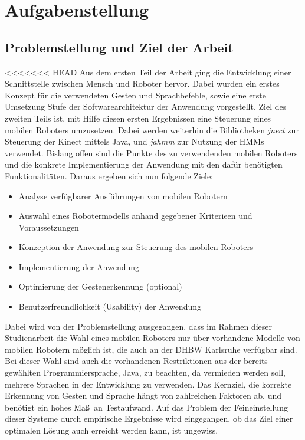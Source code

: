 \chapter{Aufgabenstellung}
\label{chap:Aufgabenstellung}

\section{Problemstellung und Ziel der Arbeit}
<<<<<<< HEAD
\label{sec:Problemstellung und Ziel der Arbeit}
Aus dem ersten Teil der Arbeit ging die Entwicklung einer Schnittstelle zwischen Mensch und Roboter hervor. Dabei wurden ein erstes Konzept f\"ur die verwendeten Gesten und Sprachbefehle, sowie eine erste Umsetzung Stufe der Softwarearchitektur der Anwendung vorgestellt. Ziel des zweiten Teils ist, mit Hilfe diesen ersten Ergebnissen eine Steuerung eines mobilen Roboters umzusetzen. Dabei werden weiterhin die Bibliotheken \textit{jnect} zur Steuerung der Kinect mittels Java, und \textit{jahmm} zur Nutzung der \glspl{HMM} verwendet. Bislang offen sind die Punkte des zu verwendenden mobilen Roboters und die konkrete Implementierung der Anwendung mit den daf\"ur ben\"otigten Funktionalit\"aten.
\newline
Daraus ergeben sich nun folgende Ziele:
\begin{itemize}
\item Analyse verf\"ugbarer Ausf\"uhrungen von mobilen Robotern
\item Auswahl eines Robotermodells anhand gegebener Kriterieen und Voraussetzungen
\item Konzeption der Anwendung zur Steuerung des mobilen Roboters
\item Implementierung der Anwendung
\item Optimierung der Gestenerkennung (optional)
\item Benutzerfreundlichkeit (Usability) der Anwendung
\end{itemize}
Dabei wird von der Problemstellung ausgegangen, dass im Rahmen dieser Studienarbeit die Wahl eines mobilen Roboters nur \"uber vorhandene Modelle von mobilen Robotern m\"oglich ist, die auch an der DHBW Karlsruhe verf\"ugbar sind. Bei dieser Wahl sind auch die vorhandenen Restriktionen aus der bereits gew\"ahlten Programmiersprache, Java, zu beachten, da vermieden werden soll, mehrere Sprachen in der Entwicklung zu verwenden.
\newline
Das Kernziel, die korrekte Erkennung von Gesten und Sprache h\"angt von zahlreichen Faktoren ab, und ben\"otigt ein hohes Ma\ss~an Testaufwand. Auf das Problem der Feineinstellung dieser Systeme durch empirische Ergebnisse wird eingegangen, ob das Ziel einer optimalen L\"osung auch erreicht werden kann, ist ungewiss.

